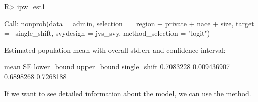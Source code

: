 \documentclass[
]{jss}
\begin{document}
\begin{CodeChunk}
\begin{CodeInput}
R> ipw_est1
\end{CodeInput}
\begin{CodeOutput}

Call:
nonprob(data = admin, selection = ~region + private + nace + 
    size, target = ~single_shift, svydesign = jvs_svy, method_selection = "logit")

Estimated population mean with overall std.err and confidence interval:

                  mean          SE lower_bound upper_bound
single_shift 0.7083228 0.009436907   0.6898268   0.7268188
\end{CodeOutput}
\end{CodeChunk}

If we want to see detailed information about the model, we can use the
 method.
\end{document}
